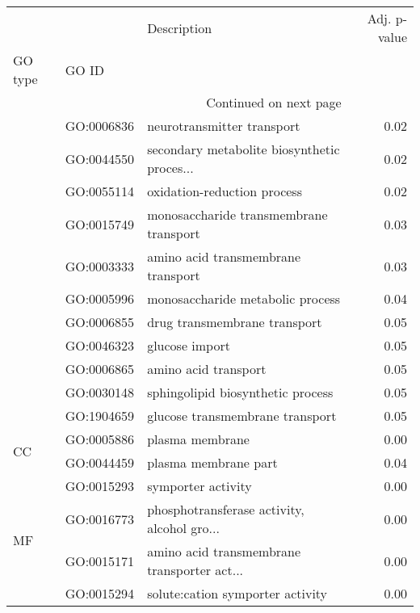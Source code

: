 \begin{longtable}{lllr}
\toprule
   &            &                                  Description &  Adj. p-value \\
GO type & GO ID &                                              &               \\
\midrule
\endhead
\midrule
\multicolumn{3}{r}{{Continued on next page}} \\
\midrule
\endfoot

\bottomrule
\endlastfoot
\multirow{11}{*}{BP} & GO:0006836 &                   neurotransmitter transport &          0.02 \\
   & GO:0044550 &  secondary metabolite biosynthetic proces... &          0.02 \\
   & GO:0055114 &                  oxidation-reduction process &          0.02 \\
   & GO:0015749 &       monosaccharide transmembrane transport &          0.03 \\
   & GO:0003333 &           amino acid transmembrane transport &          0.03 \\
   & GO:0005996 &             monosaccharide metabolic process &          0.04 \\
   & GO:0006855 &                 drug transmembrane transport &          0.05 \\
   & GO:0046323 &                               glucose import &          0.05 \\
   & GO:0006865 &                         amino acid transport &          0.05 \\
   & GO:0030148 &            sphingolipid biosynthetic process &          0.05 \\
   & GO:1904659 &              glucose transmembrane transport &          0.05 \\
\cline{1-4}
\multirow{2}{*}{CC} & GO:0005886 &                              plasma membrane &          0.00 \\
   & GO:0044459 &                         plasma membrane part &          0.04 \\
\cline{1-4}
\multirow{29}{*}{MF} & GO:0015293 &                           symporter activity &          0.00 \\
   & GO:0016773 &  phosphotransferase activity, alcohol gro... &          0.00 \\
   & GO:0015171 &  amino acid transmembrane transporter act... &          0.00 \\
   & GO:0015294 &             solute:cation symporter activity &          0.00 \\

\end{longtable}
